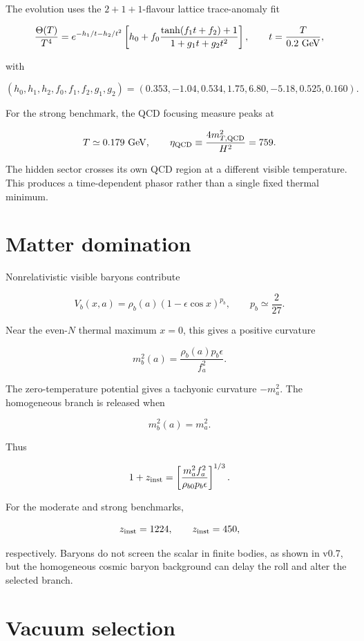 \documentclass[
  10pt,
]{article}
\begin{document}
The evolution uses the \(2+1+1\)-flavour lattice trace-anomaly fit

\[
\frac{\Theta(T)}{T^4}
=e^{-h_1/t-h_2/t^2}
\left[
 h_0+f_0
 \frac{\tanh(f_1t+f_2)+1}
 {1+g_1t+g_2t^2}
\right],
\qquad t=\frac{T}{0.2\ {\rm GeV}},
\]

with

\[
(h_0,h_1,h_2,f_0,f_1,f_2,g_1,g_2)
=(0.353,-1.04,0.534,1.75,6.80,-5.18,0.525,0.160).
\]

For the strong benchmark, the QCD focusing measure peaks at

\[
T\simeq0.179\ {\rm GeV},
\qquad
\eta_{\rm QCD}\equiv\frac{4m_{T,{\rm QCD}}^2}{H^2}=759.
\]

The hidden sector crosses its own QCD region at a different visible
temperature. This produces a time-dependent phasor rather than a single
fixed thermal minimum.

\section{Matter domination}\label{matter-domination}

Nonrelativistic visible baryons contribute

\[
V_b(x,a)=\rho_b(a)
\left(1-\epsilon\cos x\right)^{p_b},
\qquad p_b\simeq\frac{2}{27}.
\]

Near the even-\(N\) thermal maximum \(x=0\), this gives a positive
curvature

\[
m_b^2(a)=\frac{\rho_b(a)p_b\epsilon}{f_a^2}.
\]

The zero-temperature potential gives a tachyonic curvature \(-m_a^2\).
The homogeneous branch is released when

\[
m_b^2(a)=m_a^2.
\]

Thus

\[
1+z_{\rm inst}=
\left[
\frac{m_a^2f_a^2}
{\rho_{b0}p_b\epsilon}
\right]^{1/3}.
\]

For the moderate and strong benchmarks,

\[
z_{\rm inst}=1224,
\qquad
z_{\rm inst}=450,
\]

respectively. Baryons do not screen the scalar in finite bodies, as
shown in v0.7, but the homogeneous cosmic baryon background can delay
the roll and alter the selected branch.

\section{Vacuum selection}\label{vacuum-selection}
\end{document}
